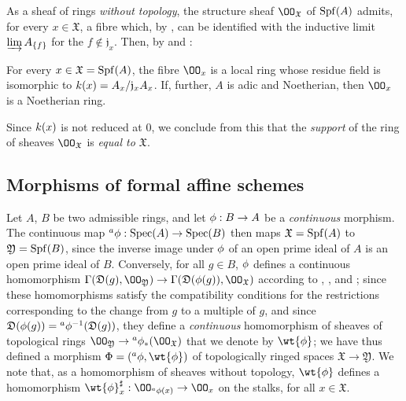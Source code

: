 \begin{env}[10.1.5]
\label{1.10.1.5}
As a sheaf of rings \emph{without topology}, the structure sheaf $\OO_\mathfrak{X}$ of $\operatorname{Spf}(A)$ admits, for every $x\in\mathfrak{X}$, a fibre which, by , can be identified with the inductive limit $\varinjlim A_{\{f\}}$ for the $f\not\in\mathfrak{j}_x$.
Then, by  and :
\end{env}

\begin{prop}[10.1.6]
\label{1.10.1.6}
For every $x\in\mathfrak{X}=\operatorname{Spf}(A)$, the fibre $\OO_x$ is a local ring whose residue field is isomorphic to $k(x)=A_x/\mathfrak{j}_xA_x$.
If, further, $A$ is adic and Noetherian, then $\OO_x$ is a Noetherian ring.
\end{prop}

Since $k(x)$ is not reduced at $0$, we conclude from this that the \emph{support} of the ring of sheaves $\OO_\mathfrak{X}$ is \emph{equal to $\mathfrak{X}$}.

\subsection{Morphisms of formal affine schemes}
\label{subsection:1.10.2}

\begin{env}[10.2.1]
\label{1.10.2.1}
Let $A$, $B$ be two admissible rings, and let $\vphi:B\to A$ be a \emph{continuous} morphism.
The continuous map ${}^a\vphi:\Spec(A)\to\Spec(B)$  then maps $\mathfrak{X}=\operatorname{Spf}(A)$ to $\mathfrak{Y}=\operatorname{Spf}(B)$, since the inverse image under $\phi$ of an open prime ideal of $A$ is an open prime ideal of $B$.
Conversely, for all $g\in B$, $\phi$ defines a continuous homomorphism $\Gamma(\mathfrak{D}(g),\OO_\mathfrak{Y})\to\Gamma(\mathfrak{D}(\vphi(g)),\OO_\mathfrak{X})$ according to , , and ;
since these homomorphisms satisfy the compatibility conditions for the restrictions corresponding to the change from $g$ to a multiple of $g$, and since $\mathfrak{D}(\phi(g))={}^a\phi^{-1}(\mathfrak{D}(g))$, they define a \emph{continuous} homomorphism of sheaves of topological rings $\OO_\mathfrak{Y}\to{}^a\vphi_*(\OO_\mathfrak{X})$  that we denote by $\wt{\vphi}$;
we have thus defined a morphism $\Phi=({}^a\vphi,\wt{\vphi})$ of topologically ringed spaces $\mathfrak{X}\to\mathfrak{Y}$.
We note that, as a homomorphism of sheaves without topology, $\wt{\vphi}$ defines a homomorphism $\wt{\vphi}_x^\sharp:\OO_{{}^a\vphi(x)}\to\OO_x$ on the stalks, for all $x\in\mathfrak{X}$.
\end{env}

